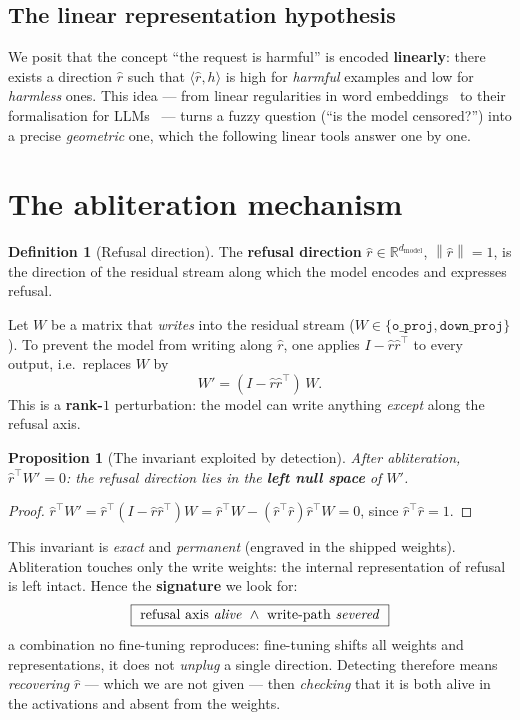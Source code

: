 \documentclass[11pt,a4paper]{article}
\theoremstyle{definition}
\newtheorem{definition}{Definition}
\theoremstyle{plain}
\newtheorem{proposition}{Proposition}
\newcommand{\R}{\mathbb{R}}
\newcommand{\rhat}{\hat{r}}
\newcommand{\norm}[1]{\left\lVert #1 \right\rVert}
\newcommand{\inner}[2]{\langle #1, #2 \rangle}
\newcommand{\dmodel}{d_{\text{model}}}
\begin{document}
\subsection{The linear representation hypothesis}
We posit that the concept ``the request is harmful'' is encoded \textbf{linearly}:
there exists a direction $\rhat$ such that $\inner{\rhat}{h}$ is high for
\emph{harmful} examples and low for \emph{harmless} ones. This idea — from linear
regularities in word embeddings~\cite{mikolov2013} to their formalisation for
LLMs~\cite{park2023} — turns a fuzzy question (``is the model censored?'') into a
precise \emph{geometric} one, which the following linear tools answer one by one.

\section{The abliteration mechanism}\label{sec:meca}
\begin{definition}[Refusal direction]
The \textbf{refusal direction} $\rhat\in\R^{\dmodel}$, $\norm{\rhat}=1$, is the
direction of the residual stream along which the model encodes and expresses refusal.
\end{definition}

Let $W$ be a matrix that \emph{writes} into the residual stream
($W\in\{\texttt{o\_proj},\texttt{down\_proj}\}$). To prevent the model from writing
along $\rhat$, one applies $I-\rhat\rhat^\top$ to every output, i.e.\ replaces $W$ by
\begin{equation}\label{eq:ablate}
  W' = (I-\rhat\rhat^\top)\,W .
\end{equation}
This is a \textbf{rank-$1$} perturbation: the model can write anything \emph{except}
along the refusal axis.

\begin{proposition}[The invariant exploited by detection]\label{prop:invariant}
After abliteration, $\rhat^\top W'=0$: the refusal direction lies in the
\textbf{left null space} of $W'$.
\end{proposition}
\begin{proof}
$\rhat^\top W'=\rhat^\top(I-\rhat\rhat^\top)W=\rhat^\top W-(\rhat^\top\rhat)\rhat^\top W=0$,
since $\rhat^\top\rhat=1$.
\end{proof}

\noindent This invariant is \emph{exact} and \emph{permanent} (engraved in the
shipped weights). Abliteration touches only the write weights: the internal
representation of refusal is left intact. Hence the \textbf{signature} we look for:
\[
  \boxed{\ \text{refusal axis \emph{alive}}\ \wedge\ \text{write-path \emph{severed}}\ }
\]
a combination no fine-tuning reproduces: fine-tuning shifts all weights and
representations, it does not \emph{unplug} a single direction. Detecting therefore
means \emph{recovering} $\rhat$ — which we are not given — then \emph{checking} that
it is both alive in the activations and absent from the weights.
\end{document}
